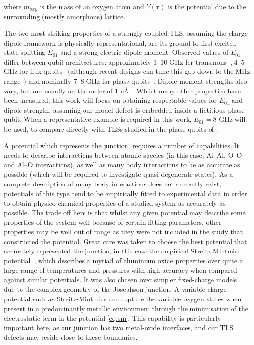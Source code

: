 
where $m_{oxy}$ is the mass of an oxygen atom and $V(\mathbf{r})$ is the potential due to the surrounding (mostly amorphous) lattice.

The two most striking properties of a strongly coupled TLS, assuming the charge dipole framework is physically representational, are its ground to first excited state splitting $E_{01}$ and a strong electric dipole moment.
Observed values of $E_{01}$  differ between qubit architectures: approximately $1$--$10$ GHz for transmons~\cite{Koch2007}, $4$--$5$ GHz for flux qubits~\cite{Lupascu2009} (although recent designs can tune this gap down to the MHz range~\cite{Schwarz2013}) and nominally $7$--$8$ GHz for phase qubits~\cite{Cole2010}.
Dipole moment strengths also vary, but are usually on the order of $1$ $e$\AA\ \cite{Cole2010,Shalibo2010}.
Whilst many other properties have been measured, this work will focus on obtaining respectable values for $E_{01}$ and dipole strength, assuming our model defect is embedded inside a fictitious phase qubit.
When a representative example is required in this work, $E_{01}=8$ GHz will be used, to compare directly with TLSs studied in the phase qubits of .

A potential which represents the junction, requires a number of capabilities.
It needs to describe interactions between atomic species (in this case, Al--Al, O--O and Al--O interactions), as well as many body interactions to be as accurate as possible (which will be required to investigate quasi-degenerate states).
As a complete description of many body interactions does not currently exist; potentials of this type tend to be empirically fitted to experimental data in order to obtain physico-chemical properties of a studied system as accurately as possible.
The trade off here is that whilst any given potential may describe some properties of the system well because of certain fitting parameters, other properties may be well out of range as they were not included in the study that constructed the potential.
Great care was taken to choose the best potential that accurately represented the junction, in this case the empirical Streitz-Mintmire potential~\cite{Streitz1994}, which describes a myriad of aluminium oxide properties over quite a large range of temperatures and pressures with high accuracy when compared against similar potentials.
It was also chosen over simpler fixed-charge models~\cite{Catlow1982,Dienes1975} due to the complex geometry of the Josephson junction.
A variable charge potential such as Streitz-Mintmire can capture the variable oxygen states when present in a predominantly metallic environment through the minimisation of the electrostatic term in the potential \cref{eq:sm}.
This capability is particularly important here, as our junction has two metal-oxide interfaces, and our TLS defects may reside close to these boundaries.

